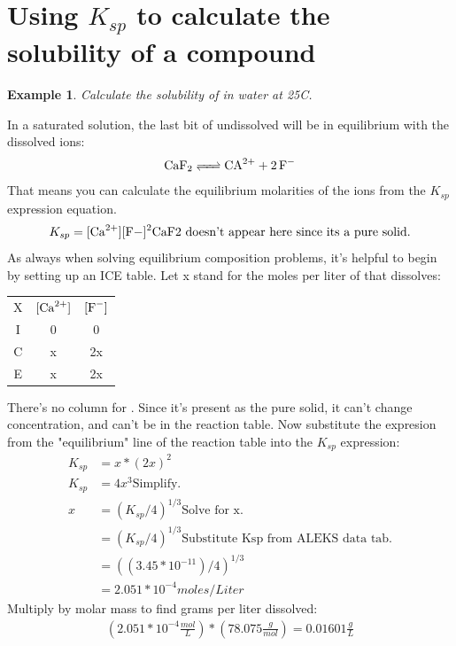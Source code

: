 \documentclass{article}  %
\newtheorem{exmp}{Example}
\begin{document}
\section*{Using $K_{sp}$ to calculate the solubility of a compound}
\begin{exmp}
    Calculate the solubility of  in water at 25C. 
\end{exmp}
In a saturated solution, the last bit of undissolved  will be in equilibrium with the dissolved ions:
\begin{equation*}
    \begin{aligned}
        \ce{CaF2 <=> CA^2+ + 2F-}
    \end{aligned}
\end{equation*}
That means you can calculate the equilibrium molarities of the ions from the $K_{sp}$ expression equation.
\begin{equation*}
    \begin{aligned}
        K_{sp} = \ce{[Ca^2+][F-]^2} \text{CaF2 doesn't appear here since its a pure solid.}
    \end{aligned}
\end{equation*}
As always when solving equilibrium composition problems, it's helpful to begin by setting up an ICE table. Let x stand for the moles per liter of  that dissolves:
\begin{center}
    \begin{tabular}{ c c c}
        X & $\ce{[Ca^2+]}$ & $\ce{[F^-]}$ \\
        I & 0 & 0  \\
        C & x & 2x \\
        E & x & 2x
    \end{tabular}
\end{center}
There's no column for . Since it's present as the pure solid, it can't change concentration, and can't be in the reaction table.
\newline
Now substitute the expresion from the "equilibrium" line of the reaction table into the $K_{sp}$ expression:
\begin{equation*}
    \begin{aligned}
        K_{sp} &= x * (2x)^2 \\
        K_{sp} &= 4x^3 \text{Simplify.}\\
        x &= (K_{sp}/4)^{1/3} \text{Solve for x.} \\
         &= (K_{sp}/4)^{1/3} \text{Substitute Ksp from ALEKS data tab.} \\
         &= ((3.45*10^{-11})/4)^{1/3} \\
         &= 2.051*10^{-4} moles/Liter
    \end{aligned}
\end{equation*}
Multiply by molar mass to find grams per liter dissolved:
\begin{equation*}
    \begin{aligned}
        (2.051*10^{-4} \frac{mol}{L})*(78.075 \frac{g}{mol}) = 0.01601 \frac{g}{L}
    \end{aligned}
\end{equation*}
\end{document}
